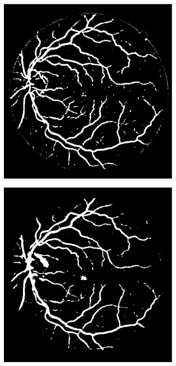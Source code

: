 \documentclass[aps,prb,10pt,twocolumn,groupedaddress]{revtex4-1}
\begin{document}
\begin{figure}[!t]
\begin{subfigure}[]{0.22\textwidth}
		\caption{}
	\end{subfigure}
	\hspace{0.25cm}
	\centering
	\begin{subfigure}[]{0.22\textwidth}
		\centering
		\includegraphics[width=\textwidth]{images/09_test_nn_best_accuracy_93.eps}
		\caption{}
	\end{subfigure}
	\hspace{0.25cm}
	\centering
	\begin{subfigure}[]{0.22\textwidth}
		\centering
		\includegraphics[width=\textwidth]{images/09_test_rf_best_accuracy_94}

\end{subfigure}
\end{figure}
\end{document}
